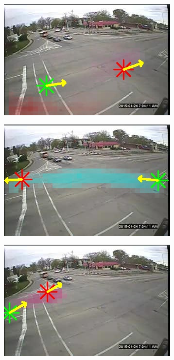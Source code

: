 \begin{figure}
\begin{subfigure}{0.32\linewidth}
        \end{subfigure}
        \begin{subfigure}{0.32\linewidth}
            \includegraphics[width=\linewidth]{./img/scene_learning/res/230955/230955-3.jpg}
        \end{subfigure}
        \begin{subfigure}{0.32\linewidth}
            \includegraphics[width=\linewidth]{./img/scene_learning/res/230955/230955-4.jpg}
        \end{subfigure}
        \begin{subfigure}{0.32\linewidth}
            \includegraphics[width=\linewidth]{./img/scene_learning/res/230955/230955-5.jpg}

\end{subfigure}
\end{figure}
